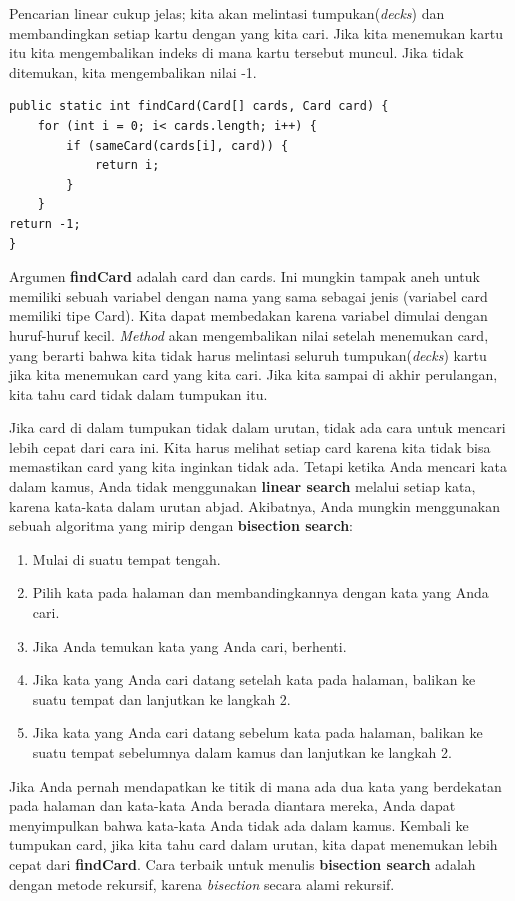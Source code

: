 \noindent Pencarian linear cukup jelas; kita akan melintasi tumpukan(\textit{decks}) dan membandingkan setiap kartu dengan yang kita cari. Jika kita menemukan kartu itu kita mengembalikan indeks di mana kartu tersebut muncul. Jika tidak ditemukan, kita mengembalikan nilai -1.
\begin{lstlisting}
public static int findCard(Card[] cards, Card card) { 
    for (int i = 0; i< cards.length; i++) {
        if (sameCard(cards[i], card)) { 
            return i; 
        }
    } 
return -1;
}
\end{lstlisting}

\noindent Argumen \textbf{findCard} adalah card dan cards. Ini mungkin tampak aneh untuk memiliki sebuah variabel dengan nama yang sama sebagai jenis (variabel card memiliki tipe Card). Kita dapat membedakan karena variabel dimulai dengan huruf-huruf kecil. \textit{Method} akan mengembalikan nilai setelah menemukan card, yang berarti bahwa kita tidak harus melintasi seluruh tumpukan(\textit{decks}) kartu jika kita menemukan card yang kita cari. Jika kita sampai di akhir perulangan, kita tahu card tidak dalam tumpukan itu.

\noindent Jika card di dalam tumpukan tidak dalam urutan, tidak ada cara untuk mencari lebih cepat dari cara ini. Kita harus melihat setiap card karena kita tidak bisa memastikan card yang kita inginkan tidak ada. Tetapi ketika Anda mencari kata dalam kamus, Anda tidak menggunakan \textbf{linear search} melalui setiap kata, karena kata-kata dalam urutan abjad. Akibatnya, Anda mungkin menggunakan sebuah algoritma yang mirip dengan \textbf{bisection search}:
\begin{enumerate}
    \item Mulai di suatu tempat tengah.
    \item Pilih kata pada halaman dan membandingkannya dengan kata yang Anda cari.
    \item Jika Anda temukan kata yang Anda cari, berhenti.
    \item Jika kata yang Anda cari datang setelah kata pada halaman, balikan ke suatu tempat dan lanjutkan ke langkah 2.
    \item Jika kata yang Anda cari datang sebelum kata pada halaman, balikan ke suatu tempat sebelumnya dalam kamus dan lanjutkan ke langkah 2.
\end{enumerate}

\noindent Jika Anda pernah mendapatkan ke titik di mana ada dua kata yang berdekatan pada halaman dan kata-kata Anda berada diantara mereka, Anda dapat menyimpulkan bahwa kata-kata Anda tidak ada dalam kamus.
Kembali ke tumpukan card, jika kita tahu card dalam urutan, kita dapat menemukan lebih cepat dari \textbf{findCard}. Cara terbaik untuk menulis \textbf{bisection search} adalah dengan metode rekursif, karena \textit{bisection} secara alami rekursif.

